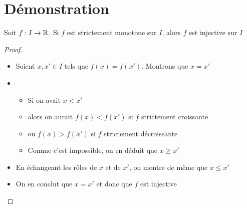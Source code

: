 \section{Démonstration}

\begin{frame}

\begin{lemme}
Soit $f:I\to \mathbb{R}$. Si $f$ est strictement monotone sur $I$, alors $f$ est injective sur $I$
\end{lemme}

\pause

\begin{proof}
\begin{itemize}
  \item Soient $x,x' \in I$ tels que $f(x)=f(x')$. Montrons que $x=x'$
\pause  
  \item 
  \begin{itemize}
    \item Si on avait $x<x'$ 
    
    \item alors on aurait $f(x)<f(x')$ si $f$ strictement croissante 
    
    \item ou $f(x)>f(x')$ si $f$ strictement décroissante 
    
    \item Comme c'est impossible, on en déduit que $x\geq x'$
   \end{itemize}   
\pause  
  
  \item En échangeant les rôles de $x$ et de $x'$, 
on montre de même que $x\leq x'$
\pause    
  \item On en conclut que $x=x'$ et donc que $f$ est injective
  
\end{itemize}

\end{proof}
\end{frame}

